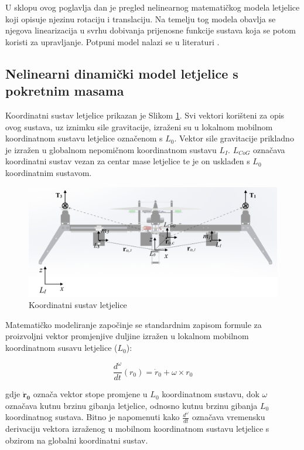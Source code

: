\documentclass[11pt,a4paper]{article}
\begin{document}
U sklopu ovog poglavlja dan je pregled nelinearnog matematičkog modela letjelice koji opisuje njezinu rotaciju i translaciju. Na temelju tog modela obavlja se njegova linearizacija u svrhu dobivanja prijenosne funkcije sustava koja se potom koristi za upravljanje. Potpuni model nalazi se u literaturi \cite{haus3}.

\medskip

\subsection{Nelinearni dinamički model letjelice s pokretnim masama}

Koordinatni sustav letjelice prikazan je Slikom \ref{fig:mod}. Svi vektori korišteni za opis ovog sustava, uz iznimku sile gravitacije, izraženi su u lokalnom mobilnom koordinatnom sustavu letjelice označenom s $L_{0}$. Vektor sile gravitacije prikladno je izražen u globalnom nepomičnom koordinatnom sustavu $L_{I}$. $L_{CoG}$ označava koordinatni sustav vezan za centar mase letjelice te je on usklađen s $L_{0}$ koordinatnim sustavom.


\begin{figure}[H]
	\centering
	\includegraphics[scale=0.23]{model}
	\caption{Koordinatni sustav letjelice}
	\label{fig:mod}
\end{figure}

Matematičko modeliranje započinje se standardnim zapisom formule za proizvoljni vektor promjenjive duljine izražen u lokalnom mobilnom koordinatnom susavu letjelice ($L_{0}$):

\begin{equation}
\frac{d^{\omega}}{dt}({r}_{0}) =  {\dot{r}}_{0} + {\omega} \times {r}_{0} 
\label{eq:r0}
\end{equation}

gdje $\boldsymbol{\dot{r}_{0}}$ označa vektor stope promjene u $L_{0}$ koordinatnom sustavu, dok $\omega$  označava kutnu brzinu gibanja letjelice, odnosno kutnu brzinu gibanja $L_{0}$ koordinatnog sustava. Bitno je napomenuti kako $\frac{d^{\omega}}{dt}$ označava vremensku derivaciju vektora izraženog u mobilnom koordinatnom sustavu letjelice s obzirom na globalni koordinatni sustav. 
\end{document}
